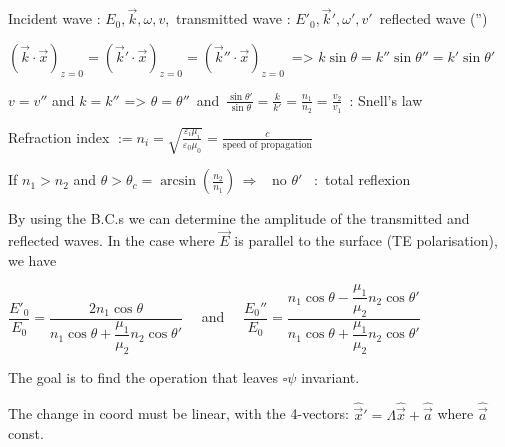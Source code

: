 \squishlist
\item Incident wave : $E_0, \vec{k}, \omega, v$,\, transmitted wave : $E'_0, \vec{k}', \omega', v'$\, reflected wave ('')


\item $(\vec{k}\cdot\vec{x})_{z=0} = (\vec{k}'\cdot\vec{x})_{z=0} = (\vec{k}''\cdot\vec{x})_{z=0}\, $ => $k\sin\theta = k''\sin\theta'' = k'\sin\theta'$

\item $v = v''$ and $k =k''$ => $\theta = \theta'' \,$ and  $\, \frac{\sin\theta'}{\sin\theta} = \frac{k}{k'} = \frac{n_1}{n_2} = \frac{v_2}{v_1} \, $ : Snell's law\

\item Refraction index $:=n_i=\sqrt{\frac{\varepsilon_i\mu_i}{\varepsilon_0\mu_0}}=\frac{c}{\text{speed of propagation}}$

\item If $n_1 > n_2$ and $\theta > \theta_c = \arcsin\left(\frac{n_2}{n_1}\right) \, \Rightarrow$ \, no $\theta'$ \, :\, total reflexion

\item[] By using the B.C.s we can determine the amplitude of the transmitted and reflected waves. In the case where $\vec{E}$ is parallel to the surface (TE polarisation), we have

\item $\dfrac{E'_0}{E_0} = \dfrac{2n_1\cos\theta}{n_1\cos\theta + \dfrac{\mu_1}{\mu_2}n_2\cos\theta'} \quad $ and $\quad \dfrac{E_0''}{E_0}  = \dfrac{n_1\cos\theta - \dfrac{\mu_1}{\mu_2}n_2\cos\theta'}{n_1\cos\theta + \dfrac{\mu_1}{\mu_2} n_2 \cos\theta'}$
\squishend
{}
\squishlist
\item[] The goal is to find the operation that leaves $\square \psi$ invariant.

\item The change in coord must be linear, with the 4-vectors: $\hat{\vec{x}}' = \Lambda\hat{\vec{x}} + \hat{\vec{a}}$ where $ \hat{\vec{a}}$ const.

